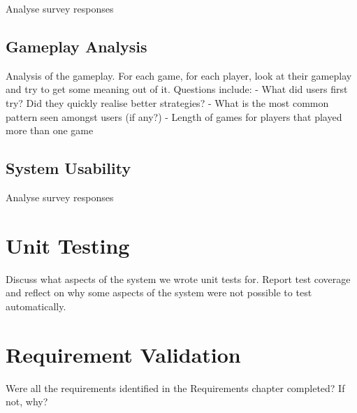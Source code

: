 \documentclass{l4proj}
\begin{document}
Analyse survey responses

\subsection{Gameplay Analysis}
Analysis of the gameplay. For each game, for each player, look at their gameplay and try to get some meaning out of it.
Questions include:
 - What did users first try? Did they quickly realise better strategies?
 - What is the most common pattern seen amongst users (if any?)
 - Length of games for players that played more than one game

\subsection{System Usability}
Analyse survey responses

\section{Unit Testing} 
Discuss what aspects of the system we wrote unit tests for. Report test coverage and reflect on why some aspects of the system were not possible to test automatically.

\section{Requirement Validation}
Were all the requirements identified in the Requirements chapter completed? If not, why?

\end{document}
